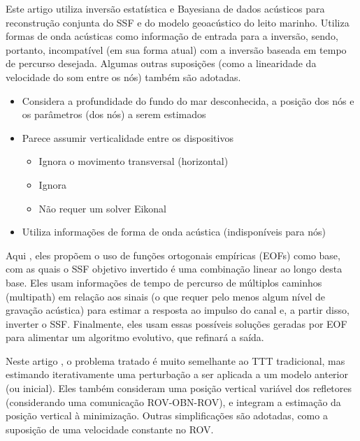 
Este artigo \cite{dosso_joint_2023} utiliza inversão estatística e Bayesiana de dados acústicos para reconstrução conjunta do SSF e do modelo geoacústico do leito marinho. Utiliza formas de onda acústicas como informação de entrada para a inversão, sendo, portanto, incompatível (em sua forma atual) com a inversão baseada em tempo de percurso desejada. Algumas outras suposições (como a linearidade da velocidade do som entre os nós) também são adotadas.

\begin{itemize}
	\item Considera a profundidade do fundo do mar desconhecida, a posição dos nós e os parâmetros (dos nós) a serem estimados
	\item Parece assumir verticalidade entre os dispositivos
	\begin{itemize}
		\item Ignora o movimento transversal (horizontal)
		\item Ignora 
		\item Não requer um solver Eikonal
	\end{itemize}
	\item Utiliza informações de forma de onda acústica (indisponíveis para nós)
\end{itemize}


Aqui \cite{radhakrishnan_inversion_2024}, eles propõem o uso de funções ortogonais empíricas (EOFs) como base, com as quais o SSF objetivo invertido é uma combinação linear ao longo desta base. Eles usam informações de tempo de percurso de múltiplos caminhos (multipath) em relação aos sinais (o que requer pelo menos algum nível de gravação acústica) para estimar a resposta ao impulso do canal e, a partir disso, inverter o SSF. Finalmente, eles usam essas possíveis soluções geradas por EOF para alimentar um algoritmo evolutivo, que refinará a saída.


Neste artigo \cite{ritter_water_2010}, o problema tratado é muito semelhante ao TTT tradicional, mas estimando iterativamente uma perturbação a ser aplicada a um modelo anterior (ou inicial). Eles também consideram uma posição vertical variável dos refletores (considerando uma comunicação ROV-OBN-ROV), e integram a estimação da posição vertical à minimização. Outras simplificações são adotadas, como a suposição de uma velocidade constante no ROV.

